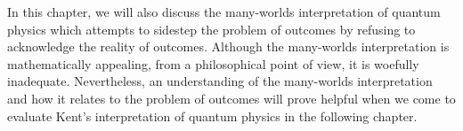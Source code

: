 In this chapter, we will also discuss the many-worlds interpretation of quantum physics which attempts to sidestep the problem of outcomes by refusing to acknowledge the reality of outcomes. Although the many-worlds interpretation is mathematically appealing, from a philosophical point of view, it is woefully inadequate. Nevertheless, an understanding of the many-worlds interpretation and how it relates to the problem of outcomes will prove helpful when we come to evaluate Kent's interpretation of quantum physics in the following chapter. 